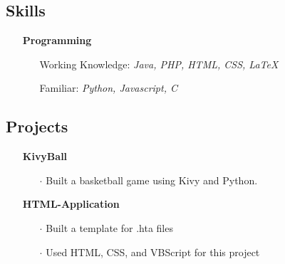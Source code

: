 \documentclass[11pt,letterpaper]{moderncv}
\begin{document}
\subsection{Skills}


\begin{itemize}

\item[]{\textbf{Programming}}

	\vspace{-8pt}
	\begin{itemize}
		\vspace{-2pt}
		\item[] Working Knowledge: \hfill \textit{Java, PHP, HTML, CSS, \LaTeX}
		\vspace{-4pt}
		\item[] Familiar: \hfill \textit{Python, Javascript, C}
		\vspace{0pt}
	\end{itemize}

\end{itemize}
\vspace{-12pt}
\subsection{Projects}

\begin{itemize}
	\item[]{\textbf{KivyBall}}
	\vspace{-8pt}
	\begin{itemize}
		\item[$\cdot$] Built a basketball game using Kivy and Python.
	\end{itemize}
	\vspace{-8pt}
	\item[]{\textbf{HTML-Application}}
	\vspace{-8pt}
	\begin{itemize}
		\item[$\cdot$] Built a template for .hta files  
		\vspace{-4pt}
		\item[$\cdot$] Used HTML, CSS, and VBScript for this project
	\end{itemize}
\end{itemize}
\end{document}
